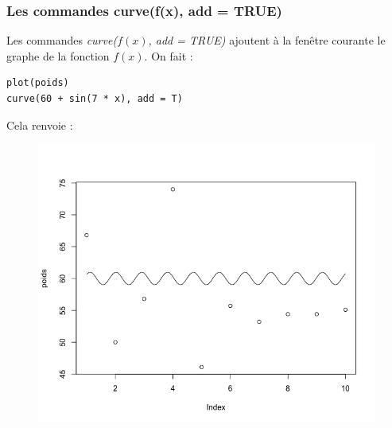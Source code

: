 \subsubsection{Les commandes curve(f(x), add = TRUE)}
Les commandes \textit{curve($f(x)$, add = TRUE)} ajoutent à la fenêtre courante le graphe de la fonction $f(x)$.\newline
On fait :
\begin{lstlisting}[language=html]
plot(poids)
curve(60 + sin(7 * x), add = T)
\end{lstlisting}
Cela renvoie :
\begin{figure}[H]\begin{center}\includegraphics[scale=0.4]{ilu/gra61.png}\end{center}\end{figure}

